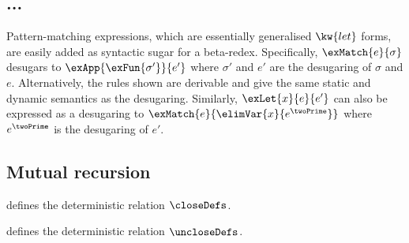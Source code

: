 


% 






% 
% 
% 
% 
% 

% 

\subsection{...}
\label{sec:impl-language:match-as}

Pattern-matching expressions, which are essentially generalised $\kw{let}$
forms, are easily added as syntactic sugar for a beta-redex. Specifically,
$\exMatch{e}{\sigma}$ desugars to $\exApp{\exFun{\sigma'}}{e'}$ where $\sigma'$
and $e'$ are the desugaring of $\sigma$ and $e$. Alternatively, the rules shown
are derivable and give the same static and dynamic semantics as the desugaring.
Similarly, $\exLet{x}{e}{e'}$ can also be expressed as a desugaring to
$\exMatch{e}{\elimVar{x}{e^\twoPrime}}$ where $e^\twoPrime$ is the desugaring of
$e'$.

\subsection{Mutual recursion}
\label{sec:impl-language:recursion}



\begin{definition}
\label{def:closedefs}
    defines the deterministic relation $\closeDefs$.
\end{definition}

\begin{definition}
\label{def:unclosedefs}
    defines the deterministic relation $\uncloseDefs$.
\end{definition}

